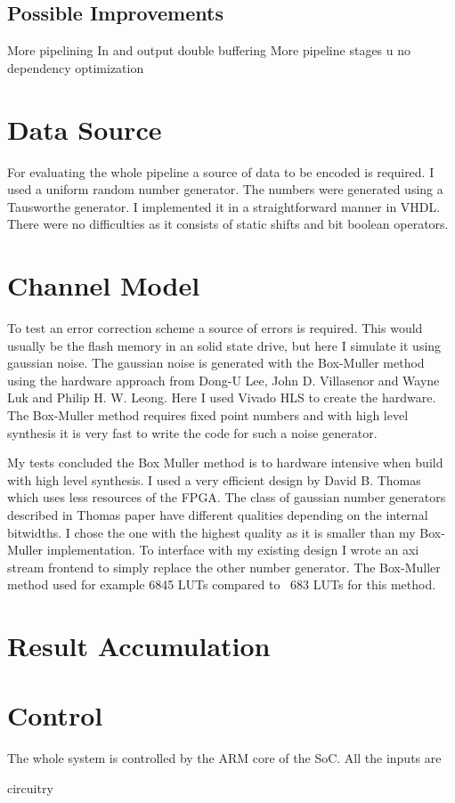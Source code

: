 \subsection{Possible Improvements}
More pipelining
In and output double buffering
More pipeline stages
u no dependency optimization

\section{Data Source}
For evaluating the whole pipeline a source of data to be encoded is required. I used a uniform random number generator. The numbers were generated using a Tausworthe generator\cite{Ec96}. I implemented it in a straightforward manner in VHDL. There were no difficulties as it consists of static shifts and bit boolean operators.

\section{Channel Model}
To test an error correction scheme a source of errors is required. This would usually be the flash memory in an solid state drive, but here I simulate it using gaussian noise. The gaussian noise is generated with the Box-Muller method using the hardware approach from Dong-U Lee, John D. Villasenor and Wayne Luk and Philip H. W. Leong\cite{LeVi06}. Here I used Vivado HLS to create the hardware. The Box-Muller method requires fixed point numbers and with high level synthesis it is very fast to write the code for such a noise generator.

My tests concluded the Box Muller method is to hardware intensive when build with high level synthesis. I used a very efficient design by David B. Thomas\cite{Th14} which uses less resources of the FPGA. The class of gaussian number generators described in Thomas paper have different qualities depending on the internal bitwidths. I chose the one with the highest quality as it is smaller than my Box-Muller implementation. To interface with my existing design I wrote an axi stream frontend to simply replace the other number generator. The Box-Muller method used for example 6845 LUTs compared to ~683 LUTs for this method.

\section{Result Accumulation}

\section{Control}
The whole system is controlled by the ARM core of the SoC. All the inputs are 

circuitry
